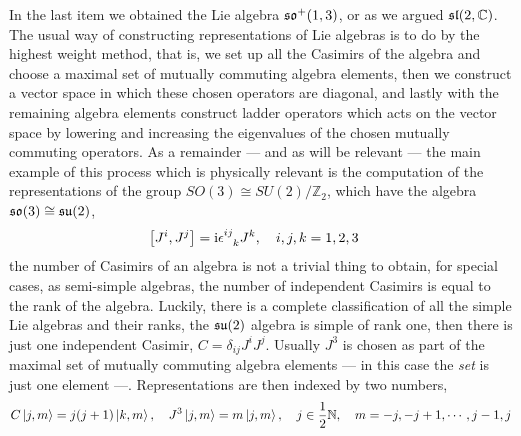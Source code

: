 In the last item we obtained the Lie algebra $\mathfrak {so}^+\qty(1,3)$, or as we argued $\mathfrak {sl}\qty(2,\mathbb C)$. The usual way of constructing representations of Lie algebras is to do by the highest weight 
method, that is, we set up all the Casimirs of the algebra and choose a maximal set of mutually commuting algebra elements, then we construct a vector space in which these chosen operators are diagonal, and lastly 
with the remaining algebra elements construct ladder operators which acts on the vector space by lowering and increasing the eigenvalues of the chosen mutually commuting operators. As a remainder --- and as will be 
relevant --- the main example of this process which 
is physically relevant is the computation of the representations of the group $SO(3)\cong SU(2)/{\mathbb Z_2}$, which have the algebra $\mathfrak {so}\qty(3)\cong \mathfrak{su}\qty(2)$,
\begin{align}
    \comm{J^i}{J^j}&=\im\tensor{\epsilon}{^i^j_k}J^k,\ \ \ i,j,k =1,2,3\label{eq:su2algebra}
\end{align}
the number of Casimirs of an algebra is not a trivial thing to obtain, for special cases, as semi-simple algebras, the number of independent Casimirs is equal to the rank of the algebra. Luckily, there is a complete 
classification of all the simple Lie algebras and their ranks, the $\mathfrak{su}\qty(2)$ algebra is simple of rank one, then there is just one independent Casimir, $C = \delta_{ij}J^iJ^j$. 
Usually $J^3$ is chosen as part of the maximal set of mutually commuting algebra elements --- in this case the \textit{set} is just one element ---. Representations are then indexed by two numbers,
\begin{align}
    C\ket{j,m} = j\qty(j+1)\ket{k,m}, \ \ \ J^3\ket{j,m} = m\ket{j,m}, \ \ \ j\in \frac12 \mathbb N,\ \ \ m = -j, -j+1,\cdots , j-1, j
\end{align}

